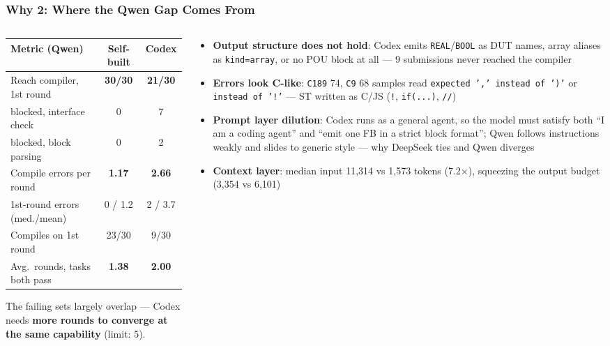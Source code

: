 \documentclass[10pt,aspectratio=169]{beamer}
\begin{document}
\begin{frame}
  \frametitle{Why 2: Where the Qwen Gap Comes From}

  \begin{columns}[T]
    \begin{column}{0.52\textwidth}
      \centering
      \small
      \setlength{\tabcolsep}{3.5pt}
      \begin{tabular}{@{}lcc@{}}
        \hline
        Metric (Qwen) & Self-built & Codex \\
        \hline
        Reach compiler, 1st round & \textbf{30/30} & \textbf{21/30} \\
        \quad blocked, interface check & 0 & 7 \\
        \quad blocked, block parsing   & 0 & 2 \\
        Compile errors per round       & \textbf{1.17} & \textbf{2.66} \\
        1st-round errors (med./mean)   & 0 / 1.2 & 2 / 3.7 \\
        Compiles on 1st round          & 23/30 & 9/30 \\
        Avg.\ rounds, tasks both pass  & \textbf{1.38} & \textbf{2.00} \\
        \hline
      \end{tabular}

      \vspace{2mm}
      \raggedright\small
      The failing sets largely overlap --- Codex needs \textbf{more rounds to
      converge at the same capability} (limit: 5).
    \end{column}
    \begin{column}{0.48\textwidth}
      \footnotesize
      \begin{itemize}
        \item \textbf{Output structure does not hold}: Codex emits
              \texttt{REAL}/\texttt{BOOL} as DUT names, array aliases as
              \texttt{kind=array}, or no POU block at all ---
              9 submissions never reached the compiler
        \item \textbf{Errors look C-like}: \texttt{C189} 74, \texttt{C9} 68
              samples read \texttt{expected ',' instead of ')'} or
              \texttt{instead of '!'} --- ST written as C/JS
              (\texttt{!}, \texttt{if(...)}, \texttt{//})
        \item \textbf{Prompt layer dilution}: Codex runs as a general agent, so
              the model must satisfy both ``I am a coding agent'' and ``emit one
              FB in a strict block format''; Qwen follows instructions weakly
              and slides to generic style --- why DeepSeek ties and Qwen
              diverges
        \item \textbf{Context layer}: median input 11,314 vs 1,573 tokens
              (7.2$\times$), squeezing the output budget (3,354 vs 6,101)
      \end{itemize}
    \end{column}
  \end{columns}

\end{frame}
\end{document}

